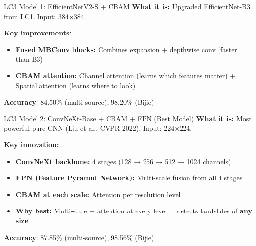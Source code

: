 \documentclass[aspectratio=169]{beamer}
\begin{document}
\begin{frame}{LC3 Model 1: EfficientNetV2-S + CBAM}
    \textbf{What it is:} Upgraded EfficientNet-B3 from LC1. Input: 384×384.

    \vspace{0.2cm}
    \textbf{Key improvements:}
    \begin{itemize}
        \item \textbf{Fused MBConv blocks:} Combines expansion + depthwise conv (faster than B3)
        \item \textbf{CBAM attention:} Channel attention (learns which features matter) + Spatial attention (learns where to look)
    \end{itemize}

    \vspace{0.2cm}
    \textbf{Accuracy:} 84.50\% (multi-source), 98.20\% (Bijie)
\end{frame}

\begin{frame}{LC3 Model 2: ConvNeXt-Base + CBAM + FPN (Best Model)}
    \textbf{What it is:} Most powerful pure CNN (Liu et al., CVPR 2022). Input: 224$\times$224.

    \vspace{0.2cm}
    \textbf{Key innovation:}
    \begin{itemize}
        \item \textbf{ConvNeXt backbone:} 4 stages (128 → 256 → 512 → 1024 channels)
        \item \textbf{FPN (Feature Pyramid Network):} Multi-scale fusion from all 4 stages
        \item \textbf{CBAM at each scale:} Attention per resolution level
        \item \textbf{Why best:} Multi-scale + attention at every level = detects landslides of \textbf{any size}
    \end{itemize}

    \vspace{0.2cm}
    \textbf{Accuracy:} 87.85\% (multi-source), 98.56\% (Bijie)
\end{frame}
\end{document}
